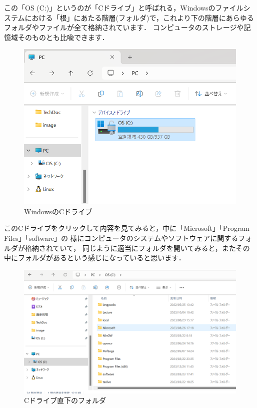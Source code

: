 \documentclass[autodetect-engine,dvi=dvipdfmx,ja=standard,a4j]{bxjsarticle}
\begin{document}
この「OS (C:)」というのが「Cドライブ」と呼ばれる，Windowsのファイルシステムにおける「根」にあたる階層(フォルダ)で，これより下の階層にあらゆるフォルダやファイルが全て格納されています．
コンピュータのストレージや記憶域そのものとも比喩できます．

\begin{figure}[H]
    \centering
    \includegraphics[width=120mm]{image/win_CDrive_img.png}
    \caption{WindowsのCドライブ}
    \label{fig:win_CDrive}
\end{figure}

このCドライブをクリックして内容を見てみると，中に「Microsoft」「Program Files」「software」の
様にコンピュータのシステムやソフトウェアに関するフォルダが格納されていて，
同じように適当にフォルダを開いてみると，またその中にフォルダがあるという感じになっていると思います．

\begin{figure}[H]
    \centering
    \includegraphics[width=120mm]{image/win_folders.png}
    \caption{Cドライブ直下のフォルダ}
    \label{fig:win_folders}
\end{figure}
\end{document}
